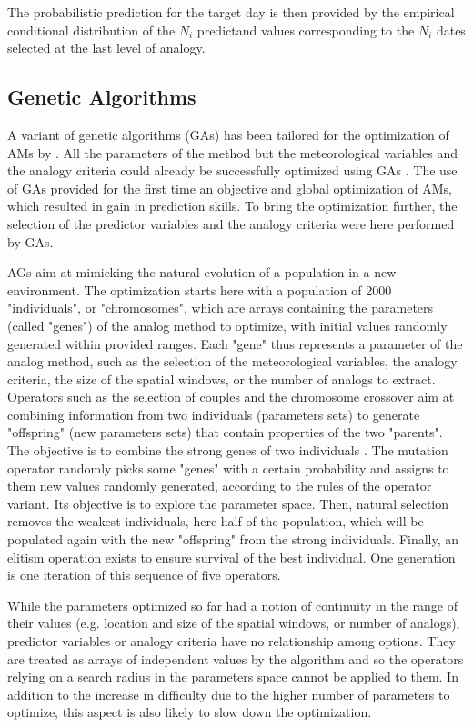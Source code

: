 \documentclass[draft]{agujournal2019}
\begin{document}
The probabilistic prediction for the target day is then provided by the empirical conditional distribution of the $N_{i}$ predictand values corresponding to the $N_{i}$ dates selected at the last level of analogy.


\subsection{Genetic Algorithms}
\label{gas}

A variant of genetic algorithms (GAs) has been tailored for the optimization of AMs by . All the parameters of the method but the meteorological variables and the analogy criteria could already be successfully optimized using GAs \cite{Horton2018a}. The use of GAs provided for the first time an objective and global optimization of AMs, which resulted in gain in prediction skills. To bring the optimization further, the selection of the predictor variables and the analogy criteria were here performed by GAs. 

AGs aim at mimicking the natural evolution of a population in a new environment. The optimization starts here with a population of 2000 "individuals", or "chromosomes", which are arrays containing the parameters (called "genes") of the analog method to optimize, with initial values randomly generated within provided ranges. Each "gene" thus represents a parameter of the analog method, such as the selection of the meteorological variables, the analogy criteria, the size of the spatial windows, or the number of analogs to extract. Operators such as the selection of couples and the chromosome crossover aim at combining information from two individuals (parameters sets) to generate "offspring" (new parameters sets) that contain properties of the two "parents". The objective is to combine the strong genes of two individuals \cite{Holland1992b}. The mutation operator randomly picks some "genes" with a certain probability and assigns to them new values randomly generated, according to the rules of the operator variant. Its objective is to explore the parameter space. Then, natural selection removes the weakest individuals, here half of the population, which will be populated again with the new "offspring" from the strong individuals. Finally, an elitism operation exists to ensure survival of the best individual. One generation is one iteration of this sequence of five operators.

While the parameters optimized so far had a notion of continuity in the range of their values (e.g. location and size of the spatial windows, or number of analogs), predictor variables or analogy criteria have no relationship among options. They are treated as arrays of independent values by the algorithm and so the operators relying on a search radius in the parameters space \cite{Horton2017a} cannot be applied to them. In addition to the increase in difficulty due to the higher number of parameters to optimize, this aspect is also likely to slow down the optimization.
\end{document}
